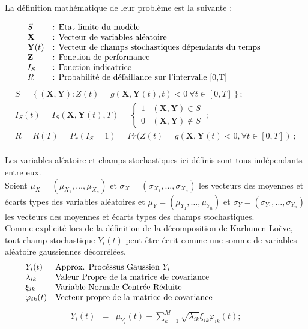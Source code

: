 \documentclass[a4paper,10pt]{article}
\begin{document}
La définition mathématique de leur problème est la suivante : 

   \[
      \begin{array}{lp{0.8\linewidth}}
         S             & : Etat limite du modèle \\
         \textbf{X}    & : Vecteur de variables aléatoire \\
         \textbf{Y}(t) & : Vecteur de champs stochastiques dépendants du temps \\
         \textbf{Z}    & : Fonction de performance \\
         I_S 	       & : Fonction indicatrice \\
         R  		   & : Probabilité de défaillance sur l'intervalle [0,T]
      \end{array}
   \]
   \begin{eqnarray}   
S = \left\lbrace \left( \textbf{X},\textbf{Y}\right) :Z(t)=g\left(\textbf{X},\textbf{Y}(t),t\right)<0\ \forall t \in\left[0,T \right] \right\rbrace ;\\
I_S(t) = I_S(\textbf{X},\textbf{Y}(t),T) = 
\begin{cases}
	1 &  (\textbf{X},\textbf{Y}) \in S \\ 
	0 &  (\textbf{X},\textbf{Y}) \not\in S
\end{cases}\ ;\\
R = R(T) = P_r(I_S=1) = Pr(Z(t) = g(\textbf{X},\textbf{Y}(t) < 0, \forall t \in \left[0,T\right]) \ ;
   \end{eqnarray}\\

Les variables aléatoire et champs stochastiques ici définis sont tous indépendants entre eux. \\

Soient $\mu_{X}=(\mu_{X_{1}},\ldots,\mu_{X_{n}})$ et $\sigma_{X}=(\sigma_{X_{1}},\ldots,\sigma_{X_{n}})$ les vecteurs des moyennes et écarts types des variables aléatoires et $\mu_{Y}=(\mu_{Y_{1}},\ldots,\mu_{Y_{n}})$ et $\sigma_{Y}=(\sigma_{Y_{1}},\ldots,\sigma_{Y_{n}})$ les vecteurs des moyennes et écarts types des champs stochastiques. \\

Comme explicité lors de la définition de la décomposition de Karhunen-Loève, tout champ stochastique $Y_{i}(t)$ peut être écrit comme une somme de variables aléatoire gaussiennes décorrélées. 
\[
	\begin{array}{lp{0.8\linewidth}}
		Y_{i}(t)		& Approx. Procéssus Gaussien $Y_{i}$ \\
		\lambda_{ik}	& Valeur Propre de la matrice de covariance \\
		\xi_{ik}		& Variable Normale Centrée Réduite \\
		\varphi_{ik}(t)	& Vecteur propre de la matrice de covariance
	\end{array}
\]
   \begin{eqnarray}
Y_{i}(t) & = & \mu_{Y_{i}}(t) +  \sum_{k=1}^{M}\sqrt{\lambda_{ik}}\xi_{ik}\varphi_{ik}(t);
   \end{eqnarray}\\
\end{document}
